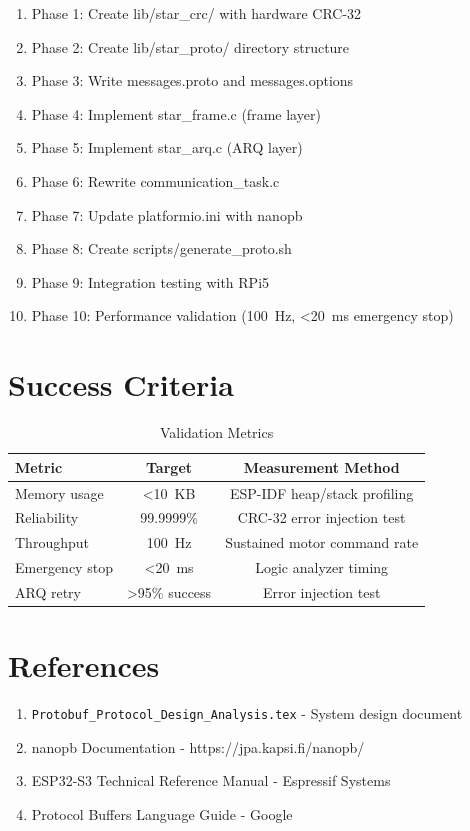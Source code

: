 \begin{enumerate}[label=\protect\Large$\square$]
    \item Phase 1: Create lib/star\_crc/ with hardware CRC-32
    \item Phase 2: Create lib/star\_proto/ directory structure
    \item Phase 3: Write messages.proto and messages.options
    \item Phase 4: Implement star\_frame.c (frame layer)
    \item Phase 5: Implement star\_arq.c (ARQ layer)
    \item Phase 6: Rewrite communication\_task.c
    \item Phase 7: Update platformio.ini with nanopb
    \item Phase 8: Create scripts/generate\_proto.sh
    \item Phase 9: Integration testing with RPi5
    \item Phase 10: Performance validation (100~Hz, <20~ms emergency stop)
\end{enumerate}

\section{Success Criteria}

\begin{table}[h]
\centering
\caption{Validation Metrics}
\begin{tabular}{lcc}
\toprule
\textbf{Metric} & \textbf{Target} & \textbf{Measurement Method} \\
\midrule
Memory usage & <10~KB & ESP-IDF heap/stack profiling \\
Reliability & 99.9999\% & CRC-32 error injection test \\
Throughput & 100~Hz & Sustained motor command rate \\
Emergency stop & <20~ms & Logic analyzer timing \\
ARQ retry & >95\% success & Error injection test \\
\bottomrule
\end{tabular}
\end{table}

\section{References}

\begin{enumerate}
    \item \texttt{Protobuf\_Protocol\_Design\_Analysis.tex} - System design document
    \item nanopb Documentation - https://jpa.kapsi.fi/nanopb/
    \item ESP32-S3 Technical Reference Manual - Espressif Systems
    \item Protocol Buffers Language Guide - Google
\end{enumerate}

